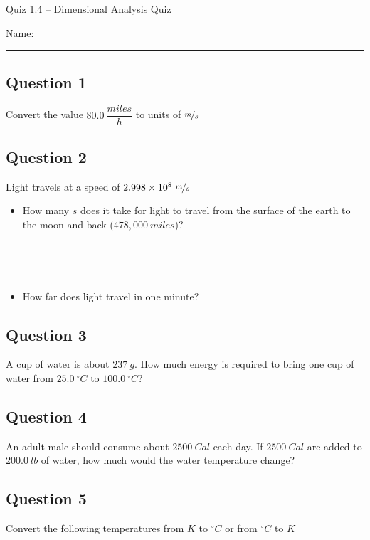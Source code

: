 \documentclass[11pt, letterpaper]{memoir}
\begin{document}
\begin{center}
	{\large	Quiz 1.4 -- Dimensional Analysis Quiz}
\end{center}
{\large Name: \rule[-1mm]{4in}{.1pt}
\subsection*{Question 1}
Convert the value $80.0~\dfrac{miles}{h}$ to units of $\nicefrac{m}{s}$

\vspace{3em}
\subsection*{Question 2}
Light travels at a speed of $2.998\times10^8~\nicefrac{m}{s}$
\begin{itemize}
	\item How many $s$ does it take for light to travel from the surface of the earth to the moon and back ($478,000~miles$)?

	      ~

	      ~

	\item How far does light travel in one minute?
\end{itemize}

\vspace{1em}
\subsection*{Question 3}
A cup of water is about $237~g$. How much energy is required to bring one cup of water from $25.0~^\circ C$ to $100.0~^\circ C$?

\vspace{3em}
\subsection*{Question 4}
An adult male should consume about $2500~Cal$ each day. If $2500~Cal$ are added to $200.0~lb$ of water, how much would the water temperature change?

\vspace{7em}
\subsection*{Question 5}
Convert the following temperatures from $K$ to $^\circ C$ or from $^\circ C$ to $K$


}
\end{document}

